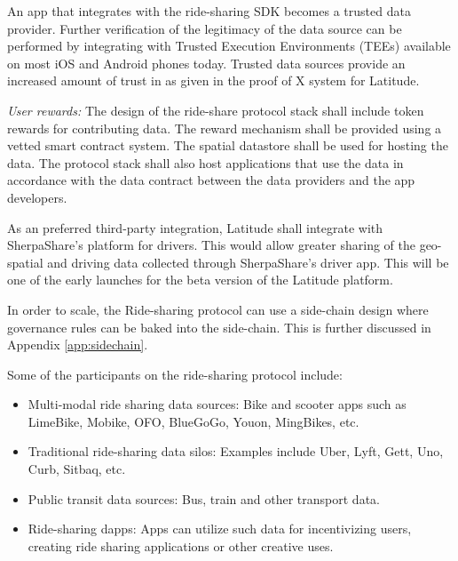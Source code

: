 An app that integrates with the ride-sharing SDK becomes a trusted data provider. Further verification of the legitimacy
of the data source can be performed by integrating with Trusted Execution Environments (TEEs) available on most iOS and
Android phones today. Trusted data sources provide an increased amount of trust in as given in the proof of X system for
Latitude.

\noindent
{\em User rewards:} The design of the ride-share protocol stack shall include token rewards for contributing data. The
reward mechanism shall be provided using a vetted smart contract system. The spatial datastore shall be used for hosting
the data. The protocol stack shall also host applications that use the data in accordance with the data contract between the
data providers and the app developers.

As an preferred third-party integration, Latitude shall integrate with SherpaShare's platform for drivers. This would
allow greater sharing of the geo-spatial and driving data collected through SherpaShare's driver app. This will be one
of the early launches for the beta version of the Latitude platform.

In order to scale, the Ride-sharing protocol can use a side-chain design where governance rules can be baked into the
side-chain. This is further discussed in Appendix \ref{app:sidechain}.

Some of the participants on the ride-sharing protocol include:

\begin{itemize}
    \item Multi-modal ride sharing data sources: Bike and scooter apps such as LimeBike, Mobike, OFO, BlueGoGo, Youon,
        MingBikes, etc.
    \item Traditional ride-sharing data silos: Examples include Uber, Lyft, Gett, Uno, Curb, Sitbaq, etc.
    \item Public transit data sources: Bus, train and other transport data.
    \item Ride-sharing dapps: Apps can utilize such data for incentivizing users, creating ride sharing applications or
        other creative uses.
\end{itemize}

%
%
%

